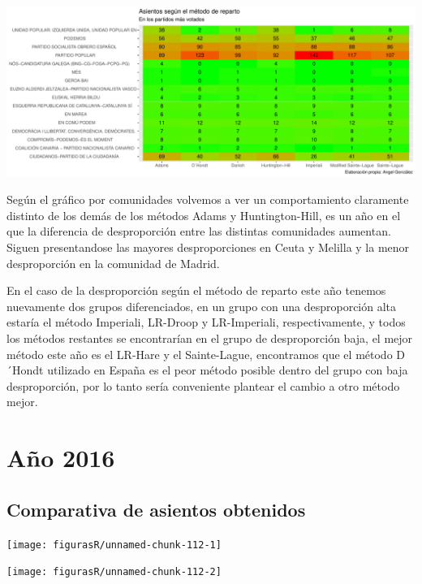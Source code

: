 \documentclass[12pt,a4paper,]{book}
\numberwithin{dummy}{section}
\theoremstyle{ocrenumbox}
\theoremstyle{blacknumex}
\theoremstyle{blacknumbox}
\theoremstyle{ocrenum}
\theoremstyle{ocrenum}
\begin{document}
\begin{center}\includegraphics[width=1\linewidth]{figurasR/unnamed-chunk-110-2} \end{center}

Según el gráfico por comunidades volvemos a ver un comportamiento
claramente distinto de los demás de los métodos Adams y Huntington-Hill,
es un año en el que la diferencia de desproporción entre las distintas
comunidades aumentan. Siguen presentandose las mayores desproporciones
en Ceuta y Melilla y la menor desproporción en la comunidad de Madrid.

En el caso de la desproporción según el método de reparto este año
tenemos nuevamente dos grupos diferenciados, en un grupo con una
desproporción alta estaría el método Imperiali, LR-Droop y LR-Imperiali,
respectivamente, y todos los métodos restantes se encontrarían en el
grupo de desproporción baja, el mejor método este año es el LR-Hare y el
Sainte-Lague, encontramos que el método D´Hondt utilizado en España es
el peor método posible dentro del grupo con baja desproporción, por lo
tanto sería conveniente plantear el cambio a otro método mejor.

\hypertarget{auxf1o-2016}{%
\section{Año 2016}\label{auxf1o-2016}}

\hypertarget{comparativa-de-asientos-obtenidos-12}{%
\subsection{Comparativa de asientos
obtenidos}\label{comparativa-de-asientos-obtenidos-12}}

\begin{center}\texttt{[image: figurasR/unnamed-chunk-112-1]} \end{center}

\begin{center}\texttt{[image: figurasR/unnamed-chunk-112-2]} \end{center}
\end{document}
